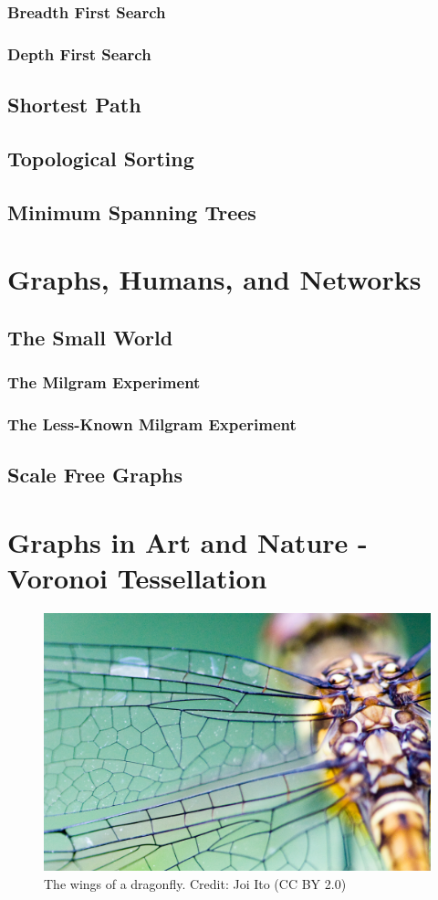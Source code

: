 \documentclass[10pt,a4paper]{book}
\begin{document}
\subsubsection{Breadth First Search}

\subsubsection{Depth First Search}


\subsection{Shortest Path}
\subsection{Topological Sorting}
\subsection{Minimum Spanning Trees}


\section{Graphs, Humans, and Networks}

\subsection{The Small World}
\subsubsection{The Milgram Experiment}
\subsubsection{The Less-Known Milgram Experiment}

\subsection{Scale Free Graphs}


\section{Graphs in Art and Nature - Voronoi Tessellation}

\begin{figure}
	\centering
	\includegraphics[width=0.7\linewidth]{pics/dragonfly_wing_joi_ito}
	\caption{The wings of a dragonfly. Credit: Joi Ito (CC BY 2.0)}
	\label{fig:dragonflywingjoiito}
\end{figure}
\end{document}
